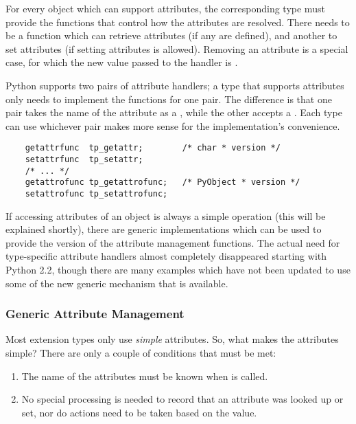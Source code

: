For every object which can support attributes, the corresponding type
must provide the functions that control how the attributes are
resolved.  There needs to be a function which can retrieve attributes
(if any are defined), and another to set attributes (if setting
attributes is allowed).  Removing an attribute is a special case, for
which the new value passed to the handler is \NULL.

Python supports two pairs of attribute handlers; a type that supports
attributes only needs to implement the functions for one pair.  The
difference is that one pair takes the name of the attribute as a
, while the other accepts a .  Each type
can use whichever pair makes more sense for the implementation's
convenience.

\begin{verbatim}
    getattrfunc  tp_getattr;        /* char * version */
    setattrfunc  tp_setattr;
    /* ... */
    getattrofunc tp_getattrofunc;   /* PyObject * version */
    setattrofunc tp_setattrofunc;
\end{verbatim}

If accessing attributes of an object is always a simple operation
(this will be explained shortly), there are generic implementations
which can be used to provide the  version of the
attribute management functions.  The actual need for type-specific
attribute handlers almost completely disappeared starting with Python
2.2, though there are many examples which have not been updated to use
some of the new generic mechanism that is available.


\subsubsection{Generic Attribute Management}


Most extension types only use \emph{simple} attributes.  So, what
makes the attributes simple?  There are only a couple of conditions
that must be met:

\begin{enumerate}
  \item   The name of the attributes must be known when
           is called.

  \item   No special processing is needed to record that an attribute
          was looked up or set, nor do actions need to be taken based
          on the value.
\end{enumerate}

